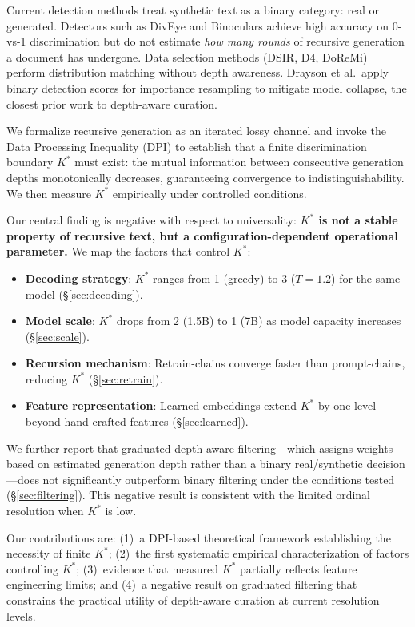 \documentclass[11pt]{article}
\begin{document}
Current detection methods treat synthetic text as a binary category: real or generated. Detectors such as DivEye and Binoculars achieve high accuracy on 0-vs-1 discrimination but do not estimate \emph{how many rounds} of recursive generation a document has undergone. Data selection methods (DSIR, D4, DoReMi) perform distribution matching without depth awareness. Drayson et al.\ apply binary detection scores for importance resampling to mitigate model collapse, the closest prior work to depth-aware curation.

We formalize recursive generation as an iterated lossy channel and invoke the Data Processing Inequality (DPI) to establish that a finite discrimination boundary $K^*$ must exist: the mutual information between consecutive generation depths monotonically decreases, guaranteeing convergence to indistinguishability. We then measure $K^*$ empirically under controlled conditions.

Our central finding is negative with respect to universality: \textbf{$K^*$ is not a stable property of recursive text, but a configuration-dependent operational parameter.} We map the factors that control $K^*$:
\begin{itemize}
    \item \textbf{Decoding strategy}: $K^*$ ranges from 1 (greedy) to 3 ($T{=}1.2$) for the same model (\S\ref{sec:decoding}).
    \item \textbf{Model scale}: $K^*$ drops from 2 (1.5B) to 1 (7B) as model capacity increases (\S\ref{sec:scale}).
    \item \textbf{Recursion mechanism}: Retrain-chains converge faster than prompt-chains, reducing $K^*$ (\S\ref{sec:retrain}).
    \item \textbf{Feature representation}: Learned embeddings extend $K^*$ by one level beyond hand-crafted features (\S\ref{sec:learned}).
\end{itemize}

We further report that graduated depth-aware filtering---which assigns weights based on estimated generation depth rather than a binary real/synthetic decision---does not significantly outperform binary filtering under the conditions tested (\S\ref{sec:filtering}). This negative result is consistent with the limited ordinal resolution when $K^*$ is low.

Our contributions are: (1)~a DPI-based theoretical framework establishing the necessity of finite $K^*$; (2)~the first systematic empirical characterization of factors controlling $K^*$; (3)~evidence that measured $K^*$ partially reflects feature engineering limits; and (4)~a negative result on graduated filtering that constrains the practical utility of depth-aware curation at current resolution levels.
\end{document}

